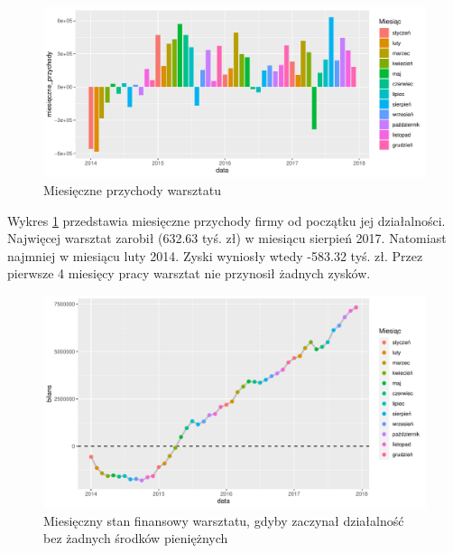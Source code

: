 \documentclass{article}\usepackage[]{graphicx}\usepackage[]{xcolor}
\makeatletter
\def\maxwidth{ %
  \ifdim\Gin@nat@width>\linewidth
    \linewidth
  \else
    \Gin@nat@width
  \fi
}
\newenvironment{knitrout}{}{} %
\makeatother
\begin{document}
\begin{knitrout}
\color{fgcolor}\begin{figure}[H]

{\centering \includegraphics[width=\maxwidth]{figure/fig_bilans-1} 

}

\caption[Miesięczne przychody warsztatu]{Miesięczne przychody warsztatu}\label{fig:fig_bilans}
\end{figure}

\end{knitrout}


Wykres \ref{fig:fig_bilans} przedstawia miesięczne przychody firmy od początku jej działalności. 
Najwięcej warsztat zarobił (632.63 tyś. zł) w miesiącu sierpień 2017.
Natomiast najmniej w miesiącu luty 2014. Zyski wyniosły wtedy -583.32 tyś. zł. Przez pierwsze 4 miesięcy pracy warsztat nie przynosił żadnych zysków.

\begin{knitrout}
\color{fgcolor}\begin{figure}[H]

{\centering \includegraphics[width=\maxwidth]{figure/fig_bilans_suma-1} 

}

\caption[Miesięczny stan finansowy warsztatu, gdyby zaczynał działalność bez żadnych środków pieniężnych]{Miesięczny stan finansowy warsztatu, gdyby zaczynał działalność bez żadnych środków pieniężnych}\label{fig:fig_bilans_suma}
\end{figure}

\end{knitrout}
\end{document}
